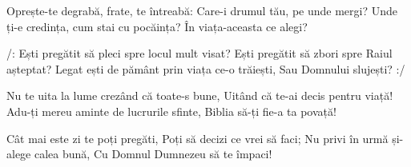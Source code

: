 \beginverse
Oprește-te degrabă, frate, te întreabă:
Care-i drumul tău, pe unde mergi?
Unde ți-e credința, cum stai cu pocăința?
În viața-aceasta ce alegi?
\endverse

\beginchorus
/: Ești pregătit să pleci spre locul mult visat?
Ești pregătit să zbori spre Raiul așteptat?
Legat ești de pământ prin viața ce-o trăiești,
Sau Domnului slujești? :/
\endchorus

\beginverse
Nu te uita la lume crezând că toate-s bune,
Uitând că te-ai decis pentru viață!
Adu-ți mereu aminte de lucrurile sfinte,
Biblia să-ți fie-a ta povață!
\endverse

\beginverse
Cât mai este zi te poți pregăti,
Poți să decizi ce vrei să faci;
Nu privi în urmă și-alege calea bună,
Cu Domnul Dumnezeu să te împaci!
\endverse
\endsong